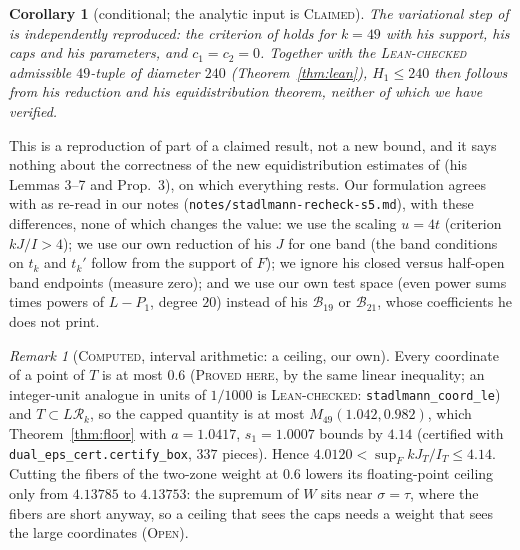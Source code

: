 \documentclass[11pt]{amsart}
\newtheorem{corollary}[theorem]{Corollary}
\theoremstyle{definition}
\theoremstyle{remark}
\newtheorem{remark}[theorem]{Remark}
\newcommand{\lbl}[1]{\textup{\textsc{#1}}}
\newcommand{\R}{\mathcal{R}}
\begin{document}
\begin{corollary}[conditional; the analytic input is \lbl{Claimed}]\label{cor:240}
The variational step of \cite{Sta26} is independently reproduced: the
criterion of \cite[Prop.~1]{Sta26} holds for $k=49$ with his support, his
caps and his parameters, and $c_1=c_2=0$. Together with the
\lbl{Lean-checked} admissible $49$-tuple of diameter $240$
(Theorem~\ref{thm:lean}), $H_1\le240$ then follows from his reduction
\cite[Prop.~1]{Sta26} and his equidistribution theorem, neither of which we
have verified.
\end{corollary}

This is a reproduction of part of a claimed result, not a new bound, and it
says nothing about the correctness of the new equidistribution estimates of
\cite{Sta26} (his Lemmas 3--7 and Prop.~3), on which everything rests. Our
formulation agrees with \cite{Sta26} as re-read in our notes
(\texttt{notes/stadlmann-\allowbreak recheck-s5.md}), with these differences, none of which
changes the value: we use the scaling $u=4t$ (criterion $kJ/I>4$); we use our
own reduction of his $J$ for one band (the band conditions on $t_k$ and
$t_k'$ follow from the support of $F$); we ignore his closed versus half-open
band endpoints (measure zero); and we use our own test space (even power sums
times powers of $L-P_1$, degree $20$) instead of his $\mathcal B_{19}$ or
$\mathcal B_{21}$, whose coefficients he does not print.

\begin{remark}[\lbl{Computed}, interval arithmetic: a ceiling, our own]\label{rem:ceiling}
Every coordinate of a point of $T$ is at most $0.6$
(\lbl{Proved here}, by the same linear inequality; an integer-unit analogue
in units of $1/1000$ is \lbl{Lean-checked}: \texttt{stadlmann\_coord\_le}) and $T\subset L\R_k$, so
the capped quantity is at most $M_{49}(1.042,0.982)$, which
Theorem~\ref{thm:floor} with $a=1.0417$, $s_1=1.0007$ bounds by $4.14$
(certified with \texttt{dual\_eps\_cert.certify\_box}, $337$ pieces). Hence
$4.0120<\sup_F kJ_T/I_T\le4.14$. Cutting the fibers of the two-zone weight at
$0.6$ lowers its floating-point ceiling only from $4.13785$ to $4.13753$: the
supremum of $W$ sits near $\sigma=\tau$, where the fibers are short anyway,
so a ceiling that sees the caps needs a weight that sees the large
coordinates (\lbl{Open}).
\end{remark}
\end{document}
